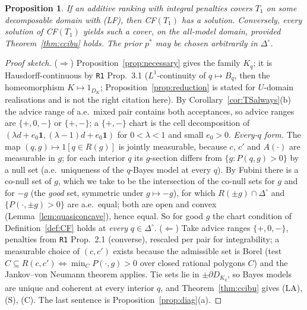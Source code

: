 \documentclass[11pt]{article}
\newtheorem{proposition}[theorem]{Proposition}
\theoremstyle{definition}
\theoremstyle{remark}
\newcommand{\one}{\mathbf 1}
\newcommand{\Di}{\Delta^{\circ}}
\newcommand{\src}[1]{\texttt{#1}}
\begin{document}
\begin{proposition}\label{prop:CF}
If an additive ranking with integral penalties covers $T_1$ on some decomposable domain with (LF), then CF$(T_1)$ has a solution. Conversely, every solution of CF$(T_1)$ yields such a cover, on the all-model domain, provided Theorem~\ref{thm:ccibu} holds. The prior $p^*$ may be chosen arbitrarily in $\Di$.
\end{proposition}
\begin{proof}[Proof sketch]
($\Rightarrow$) Proposition~\ref{prop:necessary} gives the family $K_q$; it is Hausdorff-continuous by \src{R1} Prop.~3.1 ($L^1$-continuity of $q\mapsto B_q$, then the homeomorphism $K\mapsto1_{D_K}$; Proposition~\ref{prop:reduction} is stated for $U$-domain realisations and is not the right citation here). By Corollary~\ref{cor:TSalways}(b) the advice range of a.e.\ mixed pair contains both acceptances, so advice ranges are $\{+,0,-\}$ or $\{+,-\}$; a $\{+,-\}$ chart is the cell decomposition of $(\lambda d+e_0\one,(\lambda-1)d+e_0\one)$ for $0<\lambda<1$ and small $e_0>0$. \emph{Every-$q$ form.} The map $(q,g)\mapsto1[q\in R(g)]$ is jointly measurable, because $c$, $c'$ and $A(\cdot)$ are measurable in $g$; for each interior $q$ its $g$-section differs from $\{g:P(q,g)>0\}$ by a null set (a.e.\ uniqueness of the $q$-Bayes model at every $q$). By Fubini there is a co-null set of $g$, which we take to be the intersection of the co-null sets for $g$ and for $-g$ (the \emph{good} set, symmetric under $g\mapsto-g$), for which $R(\pm g)\cap\Di$ and $\{P(\cdot,\pm g)>0\}$ are a.e.\ equal; both are open and convex (Lemma~\ref{lem:quasiconcave}), hence equal. So for good $g$ the chart condition of Definition~\ref{def:CF} holds at \emph{every} $q\in\Di$. ($\Leftarrow$) Take advice ranges $\{+,0,-\}$, penalties from \src{R1} Prop.~2.1 (converse), rescaled per pair for integrability; a measurable choice of $(c,c')$ exists because the admissible set is Borel (test $C\subseteq R(c,c')\Leftrightarrow\min_CP(\cdot,g)>0$ over closed rational polygons $C$) and the Jankov--von Neumann theorem applies. Tie sets lie in $\pm\partial D_{K_q}$, so Bayes models are unique and coherent at every interior $q$, and Theorem~\ref{thm:ccibu} gives (LA), (S), (C). The last sentence is Proposition~\ref{prop:diag}(a).
\end{proof}
\end{document}
